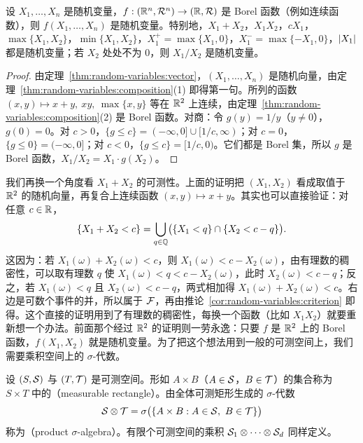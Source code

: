 \begin{corollary}\label{cor:random-variables:arithmetic}
设 $X_1,\dots,X_n$ 是随机变量，$f:(\mathbb{R}^n,\mathcal{R}^n)\to(\mathbb{R},\mathcal{R})$ 是 Borel 函数（例如连续函数），则 $f(X_1,\dots,X_n)$ 是随机变量。特别地，$X_1+X_2$，$X_1X_2$，$cX_1$，$\max\{X_1,X_2\}$，$\min\{X_1,X_2\}$，$X_1^+=\max\{X_1,0\}$，$X_1^-=\max\{-X_1,0\}$，$\lvert X_1\rvert$ 都是随机变量；若 $X_2$ 处处不为 $0$，则 $X_1/X_2$ 是随机变量。
\end{corollary}
\begin{proof}
由定理~\ref{thm:random-variables:vector}，$(X_1,\dots,X_n)$ 是随机向量，由定理~\ref{thm:random-variables:composition}(1) 即得第一句。所列的函数 $(x,y)\mapsto x+y,\ xy,\ \max\{x,y\}$ 等在 $\mathbb{R}^2$ 上连续，由定理~\ref{thm:random-variables:composition}(2) 是 Borel 函数。对商：令 $g(y)=1/y$（$y\neq0$），$g(0)=0$。对 $c>0$，$\{g\leqslant c\}=(-\infty,0]\cup[1/c,\infty)$；对 $c=0$，$\{g\leqslant0\}=(-\infty,0]$；对 $c<0$，$\{g\leqslant c\}=[1/c,0)$。它们都是 Borel 集，所以 $g$ 是 Borel 函数，$X_1/X_2=X_1\cdot g(X_2)$。
\end{proof}

我们再换一个角度看 $X_1+X_2$ 的可测性。上面的证明把 $(X_1,X_2)$ 看成取值于 $\mathbb{R}^2$ 的随机向量，再复合上连续函数 $(x,y)\mapsto x+y$。其实也可以直接验证：对任意 $c\in\mathbb{R}$，
\[
\{X_1+X_2<c\}=\bigcup_{q\in\mathbb{Q}}\bigl(\{X_1<q\}\cap\{X_2<c-q\}\bigr).
\]
这因为：若 $X_1(\omega)+X_2(\omega)<c$，则 $X_1(\omega)<c-X_2(\omega)$，由有理数的稠密性，可以取有理数 $q$ 使 $X_1(\omega)<q<c-X_2(\omega)$，此时 $X_2(\omega)<c-q$；反之，若 $X_1(\omega)<q$ 且 $X_2(\omega)<c-q$，两式相加得 $X_1(\omega)+X_2(\omega)<c$。右边是可数个事件的并，所以属于 $\mathcal{F}$，再由推论~\ref{cor:random-variables:criterion} 即得。这个直接的证明用到了有理数的稠密性，每换一个函数（比如 $X_1X_2$）就要重新想一个办法。前面那个经过 $\mathbb{R}^2$ 的证明则一劳永逸：只要 $f$ 是 $\mathbb{R}^2$ 上的 Borel 函数，$f(X_1,X_2)$ 就是随机变量。为了把这个想法用到一般的可测空间上，我们需要乘积空间上的 $\sigma$-代数。


\begin{definition}[乘积 $\sigma$-代数]\label{def:random-variables:product}
设 $(S,\mathcal{S})$ 与 $(T,\mathcal{T})$ 是可测空间。形如 $A\times B$（$A\in\mathcal{S}$，$B\in\mathcal{T}$）的集合称为 $S\times T$ 中的（measurable rectangle）。由全体可测矩形生成的 $\sigma$-代数
\[
\mathcal{S}\otimes\mathcal{T}=\sigma\bigl(\{A\times B: A\in\mathcal{S},\ B\in\mathcal{T}\}\bigr)
\]
称为（product $\sigma$-algebra）。有限个可测空间的乘积 $\mathcal{S}_1\otimes\cdots\otimes\mathcal{S}_d$ 同样定义。
\end{definition}

